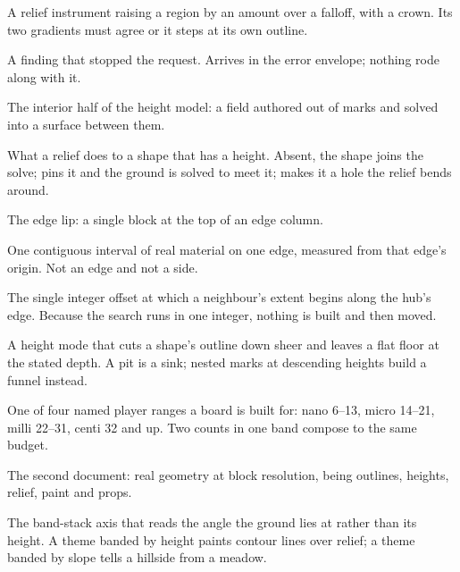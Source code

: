 \begin{description}[leftmargin=0pt,style=nextline,itemsep=3pt,font=\normalfont\sffamily\bfseries]
\item[Push] A relief instrument raising a region by an amount over a falloff, with a
  crown. Its two gradients must agree or it steps at its own outline.

\item[Refusal] A finding that stopped the request. Arrives in the error envelope;
  nothing rode along with it.

\item[Relief] The interior half of the height model: a field authored out of marks
  and solved into a surface between them.

\item[\id{relief\_scope}] What a relief does to a shape that has a height. Absent,
  the shape joins the solve;  pins it and the ground is solved to meet it;
   makes it a hole the relief bends around.

\item[Rim] The edge lip: a single block at the top of an edge column.

\item[Run] One contiguous interval of real material on one edge, measured from that
  edge's origin. Not an edge and not a side.

\item[Seat] The single integer offset at which a neighbour's extent begins along the
  hub's edge. Because the search runs in one integer, nothing is built and then
  moved.

\item[Sink] A height mode that cuts a shape's outline down sheer and leaves a flat
  floor at the stated depth. A pit is a sink; nested marks at descending heights build
  a funnel instead.

\item[Size band] One of four named player ranges a board is built for: nano 6--13,
  micro 14--21, milli 22--31, centi 32 and up. Two counts in one band compose to the
  same budget.

\item[Sketch layout] The second document: real geometry at block resolution, being
  outlines, heights, relief, paint and props.

\item[Slope axis] The band-stack axis that reads the angle the ground lies at rather
  than its height. A theme banded by height paints contour lines over relief; a theme
  banded by slope tells a hillside from a meadow.


\end{description}
